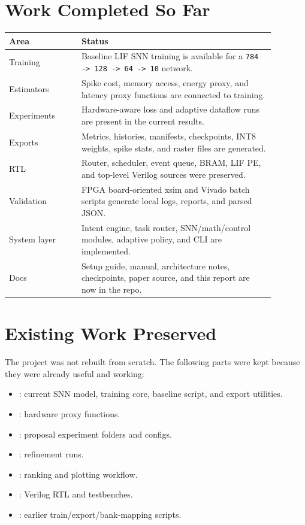 \documentclass[11pt]{article}
\begin{document}
\section{Work Completed So Far}
\begin{center}
\begin{tabular}{p{0.24\linewidth}p{0.64\linewidth}}
\toprule
Area & Status \\
\midrule
Training & Baseline LIF SNN training is available for a \texttt{784 -> 128 -> 64 -> 10} network. \\
Estimators & Spike cost, memory access, energy proxy, and latency proxy functions are connected to training. \\
Experiments & Hardware-aware loss and adaptive dataflow runs are present in the current results. \\
Exports & Metrics, histories, manifests, checkpoints, INT8 weights, spike stats, and raster files are generated. \\
RTL & Router, scheduler, event queue, BRAM, LIF PE, and top-level Verilog sources were preserved. \\
Validation & FPGA board-oriented xsim and Vivado batch scripts generate local logs, reports, and parsed JSON. \\
System layer & Intent engine, task router, SNN/math/control modules, adaptive policy, and CLI are implemented. \\
Docs & Setup guide, manual, architecture notes, checkpoints, paper source, and this report are now in the repo. \\
\bottomrule
\end{tabular}
\end{center}

\section{Existing Work Preserved}
The project was not rebuilt from scratch. The following parts were kept because
they were already useful and working:
\begin{itemize}[leftmargin=*]
\item {}: current SNN model, training core, baseline script,
and export utilities.
\item {}: hardware proxy functions.
\item {}: proposal experiment folders and configs.
\item {}: refinement runs.
\item {}: ranking and plotting workflow.
\item {}: Verilog RTL and testbenches.
\item {}: earlier train/export/bank-mapping scripts.
\end{itemize}
\end{document}
